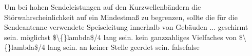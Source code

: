     {Um bei hohen Sendeleistungen auf den Kurzwellenbändern die Störwahrscheinlichkeit auf ein Mindestmaß zu begrenzen, sollte die für die Sendeantenne verwendete Speiseleitung innerhalb von Gebäuden ...}
    {geschirmt sein.}
    {möglichst \$\textbackslash\{\}lambda\$/4 lang sein.}
    {kein ganzzahliges Vielfaches von \$\textbackslash\{\}lambda\$/4 lang sein.}
    {an keiner Stelle geerdet sein.}
    {false}{false}